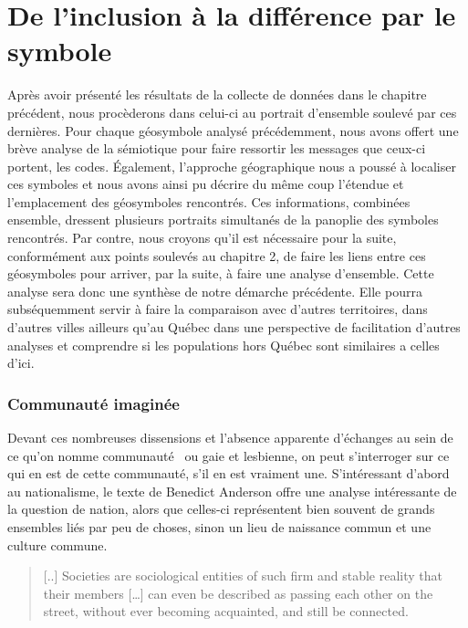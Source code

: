 
\chapter{De l'inclusion à la différence par le symbole}
\label{cha:de_l_inclusion_la_diff_rence_par_le_symbole}

Après avoir présenté les résultats de la collecte de données dans le chapitre précédent, nous procèderons dans celui-ci au portrait d'ensemble soulevé par ces dernières.
Pour chaque géosymbole analysé précédemment, nous avons offert une brève analyse de la sémiotique pour faire ressortir les messages que ceux-ci portent, les codes.
Également, l'approche géographique nous a poussé à localiser ces symboles et nous avons ainsi pu décrire du même coup l'étendue et l'emplacement des géosymboles rencontrés.
Ces informations, combinées ensemble, dressent plusieurs portraits simultanés de la panoplie des symboles rencontrés.
Par contre, nous croyons qu'il est nécessaire pour la suite, conformément aux points soulevés au chapitre 2, de faire les liens entre ces géosymboles pour arriver, par la suite, à faire une analyse d'ensemble.
Cette analyse sera donc une synthèse de notre démarche précédente.
Elle pourra subséquemment servir à faire la comparaison avec d'autres territoires, dans d'autres villes ailleurs qu'au Québec dans une perspective de facilitation d'autres analyses et comprendre si les populations \lgbt{} hors Québec sont similaires a celles d'ici.


\subsection{Communauté imaginée}
\label{sub:communaut_imagin_e}
Devant ces nombreuses dissensions et l'absence apparente d'échanges au sein de ce qu'on nomme communauté~\lgbt{} ou gaie et lesbienne, on peut s'interroger sur ce qui en est de cette communauté, s'il en est vraiment une.
S'intéressant d'abord au nationalisme, le texte de Benedict Anderson offre une analyse intéressante de la question de nation, alors que celles-ci représentent bien souvent de grands ensembles liés par peu de choses, sinon un lieu de naissance commun et une culture commune.
\begin{quote}	
[..] Societies are sociological entities of such firm and stable reality that their members […] can even be described as passing each other on the street, without ever becoming acquainted, and still be connected.~\citep[25]{Anderson1983}
\end{quote}

